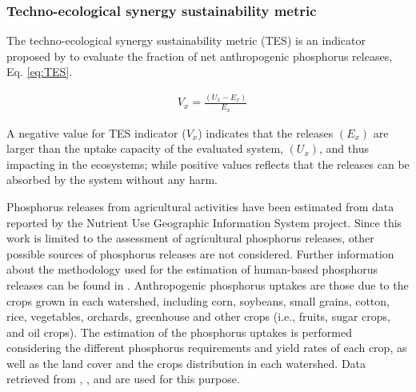 \begin{refsection}[referencesCh4]
\subsubsection{Techno-ecological synergy sustainability metric}
The techno-ecological synergy sustainability metric (TES) is an indicator proposed by \citet{TESmetric} to evaluate the fraction of net anthropogenic phosphorus releases, Eq. \ref{eq:TES}. 

\begin{align}
& V_{x} =\frac{\left(U_{x} - E_{x}\right)}{E_{x}} \label{eq:TES}
\end{align}

A negative value for TES indicator ($V_{x}$) indicates that the releases $\left(E_{x}\right)$ are larger than the uptake capacity of the evaluated system, $\left(U_{x}\right)$, and thus impacting in the ecosystems; while positive values reflects that the releases can be absorbed by the system without any harm. 

Phosphorus releases from agricultural activities have been estimated from data reported by the Nutrient Use Geographic Information System project. Since this work is limited to the assessment of agricultural phosphorus releases, other possible sources of phosphorus releases are not considered. Further information about the methodology used for the estimation of human-based phosphorus releases can be found in \citet{NuGIS}. Anthropogenic phosphorus uptakes are those due to the crops grown in each watershed, including corn, soybeans, small grains, cotton, rice, vegetables, orchards, greenhouse and other crops (i.e., fruits, sugar crops, and oil crops). The estimation of the phosphorus uptakes is performed considering the different phosphorus requirements and yield rates of each crop, as well as the land cover and the crops distribution in each watershed. Data retrieved from \citet{2017CensusofAgriculture}, \citet{USDAHandbook}, and \citet{EnviroAtlas} are used for this purpose.


\end{refsection}

